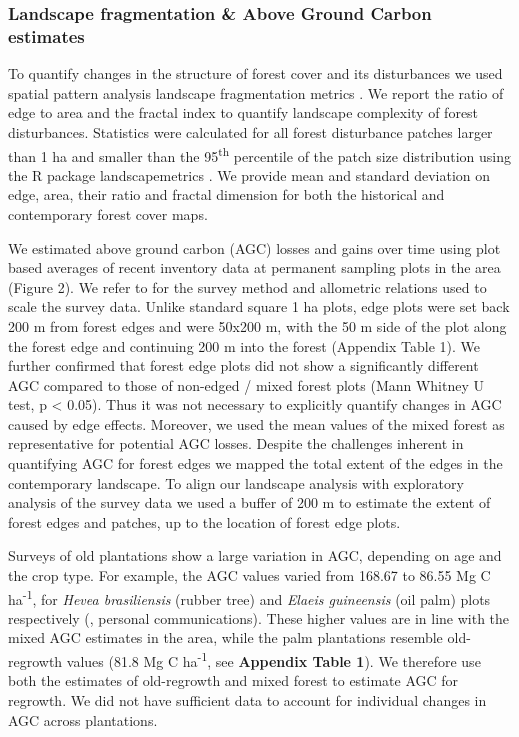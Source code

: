 \documentclass[remote sensing,article,submit,moreauthors,pdftex]{mdpi}
\begin{document}
\hypertarget{landscape-fragmentation-above-ground-carbon-estimates}{%
\subsubsection{Landscape fragmentation \& Above Ground Carbon
estimates}\label{landscape-fragmentation-above-ground-carbon-estimates}}

To quantify changes in the structure of forest cover and its
disturbances we used spatial pattern analysis landscape fragmentation
metrics \citep{dale1999}. We report the ratio of edge to area and the
fractal index to quantify landscape complexity of forest disturbances.
Statistics were calculated for all forest disturbance patches larger
than 1 ha and smaller than the 95\textsuperscript{th} percentile of the
patch size distribution using the R package landscapemetrics
\citep{hesselbarth2019}. We provide mean and standard deviation on edge,
area, their ratio and fractal dimension for both the historical and
contemporary \citet{hansen2013} forest cover maps.

We estimated above ground carbon (AGC) losses and gains over time using
plot based averages of recent inventory data at permanent sampling plots
in the area (Figure 2). We refer to \citet{Kearsley2013} for the survey
method and allometric relations used to scale the survey data. Unlike
standard square 1 ha plots, edge plots were set back 200 m from forest
edges and were 50x200 m, with the 50 m side of the plot along the forest
edge and continuing 200 m into the forest (Appendix Table 1). We further
confirmed that forest edge plots did not show a significantly different
AGC compared to those of non-edged / mixed forest plots (Mann Whitney U
test, p \textless{} 0.05). Thus it was not necessary to explicitly
quantify changes in AGC caused by edge effects. Moreover, we used the
mean values of the mixed forest as representative for potential AGC
losses. Despite the challenges inherent in quantifying AGC for forest
edges we mapped the total extent of the edges in the contemporary
landscape. To align our landscape analysis with exploratory analysis of
the survey data we used a buffer of 200 m to estimate the extent of
forest edges and patches, up to the location of forest edge plots.

Surveys of old plantations show a large variation in AGC, depending on
age and the crop type. For example, the AGC values varied from 168.67 to
86.55 Mg C ha\textsuperscript{-1}, for \emph{Hevea brasiliensis} (rubber
tree) and \emph{Elaeis guineensis} (oil palm) plots respectively
(\citet{bustillo2018}, personal communications). These higher values are
in line with the mixed AGC estimates in the area, while the palm
plantations resemble old-regrowth values (81.8 Mg C
ha\textsuperscript{-1}, see \textbf{Appendix Table 1}). We therefore use
both the estimates of old-regrowth and mixed forest to estimate AGC for
regrowth. We did not have sufficient data to account for individual
changes in AGC across plantations.
\end{document}

